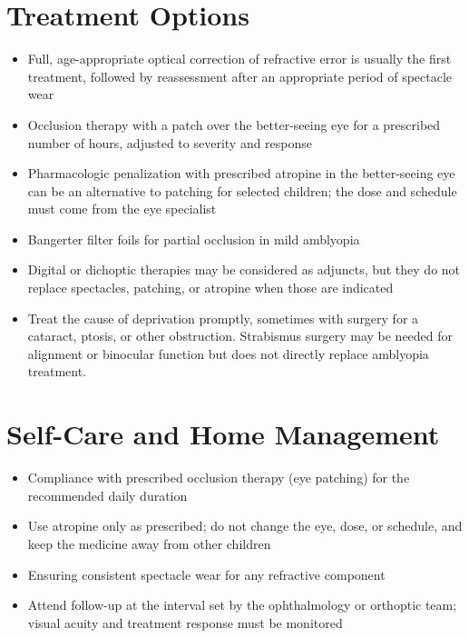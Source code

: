 \section*{Treatment Options}
\begin{itemize}
 \item Full, age-appropriate optical correction of refractive error is usually the first treatment, followed by reassessment after an appropriate period of spectacle wear
 \item Occlusion therapy with a patch over the better-seeing eye for a prescribed number of hours, adjusted to severity and response
 \item Pharmacologic penalization with prescribed atropine in the better-seeing eye can be an alternative to patching for selected children; the dose and schedule must come from the eye specialist
 \item Bangerter filter foils for partial occlusion in mild amblyopia
 \item Digital or dichoptic therapies may be considered as adjuncts, but they do not replace spectacles, patching, or atropine when those are indicated
 \item Treat the cause of deprivation promptly, sometimes with surgery for a cataract, ptosis, or other obstruction. Strabismus surgery may be needed for alignment or binocular function but does not directly replace amblyopia treatment.
\end{itemize}

\section*{Self-Care and Home Management}
\begin{itemize}
 \item Compliance with prescribed occlusion therapy (eye patching) for the recommended daily duration
 \item Use atropine only as prescribed; do not change the eye, dose, or schedule, and keep the medicine away from other children
 \item Ensuring consistent spectacle wear for any refractive component
 \item Attend follow-up at the interval set by the ophthalmology or orthoptic team; visual acuity and treatment response must be monitored
\end{itemize}

